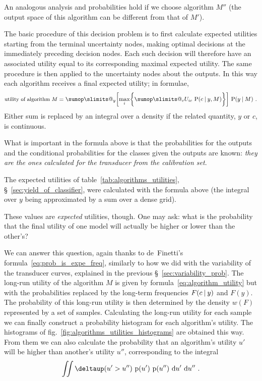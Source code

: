 \documentclass[\ifafour a4paper,12pt,\else a5paper,10pt,\fi%
onecolumn,oneside,article,%
british%
]{memoir}
\makeatletter
\theoremstyle{remark}
\theoremstyle{innote}
\def\sum{\DOTSI\sumop\slimits@}
\newcommand*{\delt}{\deltaup}%
\newcommand*{\di}{\mathrm{d}}%
\DeclarePairedDelimiter\set{\{}{\}} %
\newcommand*{\p}{\mathrm{p}}%
\renewcommand*{\P}{\mathrm{P}}%
\renewcommand*{\|}[1][]{\nonscript\:#1\vert\nonscript\:\mathopen{}}
\newcommand*{\sect}{\S}%
\newcommand*{\fig}{fig.}%
\newcommand*{\wf}{w}
\newcommand*{\texts}[1]{\text{\small #1}}
\makeatother
\begin{document}
An analogous analysis and probabilities hold if we choose algorithm $M''$ (the output space of this algorithm can be different from that of $M'$).

The basic procedure of this decision problem is to first calculate expected utilities starting from the terminal uncertainty nodes, making optimal decisions at the immediately preceding decision nodes. Each such decision will therefore have an associated utility equal to its corresponding maximal expected utility. The same procedure is then applied to the uncertainty nodes about the outputs. In this way each algorithm receives a final expected utility; in formulae,
\begin{equation}
  \label{eq:algorithm_utility}
\texts{utility of algorithm $M$} =  \sum_{y} \biggl[\max_{i}\set[\bigg]{\sum_{c} U_{ic}\ \P(c \| y, M)}\biggr]\
  \P(y \| M) \ .
\end{equation}
Either sum is replaced by an integral over a density if the related quantity, $y$ or $c$, is continuous.

What is important in the formula above is that the probabilities for the outputs and the conditional probabilities for the classes given the outputs are known: \emph{they are the ones calculated for the transducer from the calibration set}.

The expected utilities of table~\ref{tab:algorithms_utilities}, \sect~\ref{sec:yield_of_classifier}, were calculated with the formula above (the integral over $y$ being approximated by a sum over a dense grid).

\medskip

These values are \emph{expected} utilities, though. One may ask: what is the probability that the final utility of one model will actually be higher or lower than the other's?

We can answer this question, again thanks to de~Finetti's formula~\eqref{eq:prob_is_expe_freq}, similarly to how we did with the variability of the transducer curves, explained in the previous \sect~\ref{sec:variability_prob}. The long-run utility of the algorithm $M$ is given by formula~\eqref{eq:algorithm_utility} but with the probabilities replaced by the long-term frequencies $F(c\|y)$ and $F(y)$. The probability of this long-run utility is then determined by the density $\wf(F)$ represented by a set of samples. Calculating the long-run utility for each sample we can finally construct a probability histogram for each algorithm's utility. The histograms of \fig~\ref{fig:algorithms_utilities_histograms} are obtained this way. From them we can also calculate the probability that an algorithm's utility $u'$ will be higher than another's utility $u''$, corresponding to the integral
\begin{equation}
  \label{eq:compare_alg_utilities}
\iint \delt(u' > u'')\ \p(u')\ \p(u'')\ \di u'\ \di u'' \ .
\end{equation}
\end{document}
